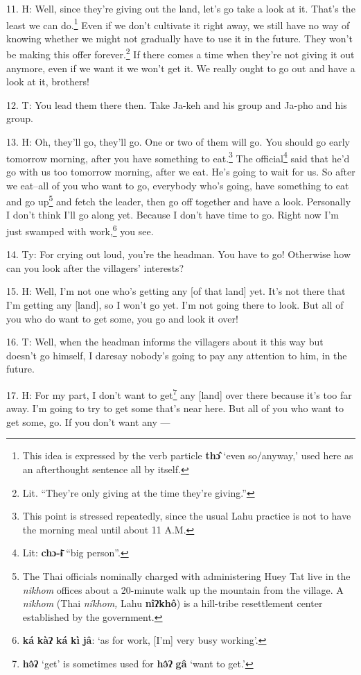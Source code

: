11. H: Well, since they're giving out the land, let's go take a look at it. That's
the least we can do.\footnote{This idea is expressed by the verb particle \textbf{thɔ̂} `even so/anyway,' used here as an afterthought sentence all by itself.} Even if we don't cultivate it right away, we still have
no way of knowing whether we might not gradually have to use it in the future.
They won't be making this offer forever.\footnote{Lit. ``They're only giving at the time they're giving.''} If there comes a time when they're
not giving it out anymore, even if we want it we won't get it. We really ought
to go out and have a look at it, brothers!

12. T: You lead them there then. Take Ja-keh and his group and Ja-pho and his
group.

13. H: Oh, they'll go, they'll go. One or two of them will go. You should go early
tomorrow morning, after you have something to eat.\footnote{This point is stressed repeatedly, since the usual Lahu practice is not to have the morning meal until about 11 A.M.} The official\footnote{Lit: \textbf{chɔ-ɨ̄} ``big person''.} said that
he'd go with us too tomorrow morning, after we eat. He's going to wait for us.
So after we eat--all of you who want to go, everybody who's going, have something
to eat and go up\footnote{The Thai officials nominally charged with administering Huey Tat live in the \textit{nikhom}  offices about a 20-minute walk up the mountain from the village. A \textit{nikhom}  (Thai \textit{níkhom,} Lahu \textbf{nîʔkhô}) is a hill-tribe resettlement center established by the government.} and fetch the leader, then go off together and have a look.
Personally I don't think I'll go along yet. Because I don't have time to go. Right
now I'm just swamped with work,\footnote{\textbf{ká} \textbf{kàʔ} \textbf{ká} \textbf{kì} \textbf{jâ}: `as for work, [I'm] very busy working'.} you see.

14. Ty: For crying out loud, you're the headman. You have to go! Otherwise
how can you look after the villagers' interests?

15. H: Well, I'm not one who's getting any [of that land] yet. It's not there that
I'm getting any [land], so I won't go yet. I'm not going there to look. But all
of you who do want to get some, you go and look it over!

16. T: Well, when the headman informs the villagers about it this way but doesn't
go himself, I daresay nobody's going to pay any attention to him, in the future.

17. H: For my part, I don't want to get\footnote{\textbf{hə̂ʔ} `get' is sometimes used for \textbf{hə̂ʔ} \textbf{gâ} `want to get.'} any [land] over there because it's too
far away. I'm going to try to get some that's near here. But all of you who want
to get some, go. If you don't want any ---

